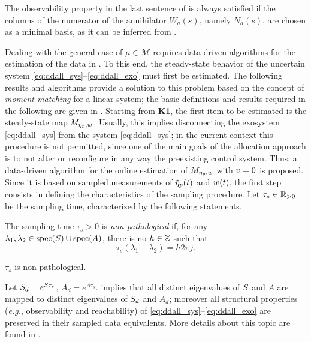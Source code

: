 \begin{remark}
  The observability property in the last sentence of  is always satisfied if the columns of the numerator of the annihilator $W_a(s)$, namely $N_{a}(s)$, are chosen as a minimal basis,	as it can be inferred from \cite[Thm. 6.5.10]{kailath_linear_1980}.\closeremark
\end{remark}

Dealing with the general case of $\mu\in\mathcal{M}$ requires data-driven algorithms for the estimation of the data in . To this end, the steady-state behavior of the uncertain system \eqref{eq:ddall_sys}--\eqref{eq:ddall_exo} must first be estimated. The following results and algorithms provide a solution to this problem based on the concept of \emph{moment matching} for a linear system; the basic definitions and results required in the following are given in . Starting from \textbf{K1}, the first item to be estimated is the steady-state map $\bar{M}_{\eta_p,w}$. Usually, this implies disconnecting the exosystem \eqref{eq:ddall_sys} from the system \eqref{eq:ddall_sys}; in the current context this procedure is not permitted, since one of the main goals of the allocation approach is to not alter or reconfigure in any way the preexisting control system. Thus, a data-driven algorithm for the online estimation of $\bar{M}_{\eta_p,w}$ with $\upsilon=0$ is proposed. Since it is based on sampled measurements of $\tilde{\eta}_p(t)$ and $w(t)$, the first step consists in defining the characteristics of the sampling procedure. Let $\tau_s\in\mathbb{R}_{>0}$ be the sampling time, characterized by the following statements.
\begin{definition}
  \label{def:ddall_nonpatho}
  The sampling time $\tau_s>0$ is \emph{non-pathological} if, for any $\lambda_1,\lambda_2\in\operatorname{spec}(S)\cup\operatorname{spec}(A)$, there is no $h\in\mathbb{Z}$ such that
  \begin{equation}
    \tau_s(\lambda_1-\lambda_2)=h2\pi j.
  \end{equation}
  \closestatement
\end{definition}
\begin{assumption}
  \label{ass:ddall_nonpatho}
  $\tau_s$ is non-pathological.\closestatement
\end{assumption}
Let $S_d=e^{S\tau_s}$, $A_d=e^{A\tau_s}$.  implies that all distinct eigenvalues of $S$ and $A$ are mapped to distinct eigenvalues of $S_d$ and $A_d$; moreover all structural properties (\emph{e.g.}, observability and reachability) of \eqref{eq:ddall_sys}--\eqref{eq:ddall_exo} are preserved in their sampled data equivalents. More details about this topic are found in \cite[Sec. 3.2]{chen_optimal_1995}.

